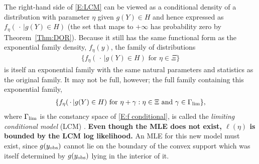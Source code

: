 The right-hand side of \eqref{E:LCM} can be viewed as a conditional density of a 
distribution with parameter $\eta$ given $g(Y) \in H$ and hence expressed as $f_{\eta}
(\, \cdot\,  | g(Y) \in H)$ (the set that maps to $+\infty$ has probability zero by 
Theorem~\ref{Thm:DOR}).  Because it still has the same functional form as the 
exponential family density, $f_\eta(y)$, the family of distributions
\begin{align} \label{E:f conditional}
\{ f_{\eta}(\, \cdot\,  | g(Y) \in H) \text{ for } \eta \in \Xi \}
\end{align}
is itself an exponential family with the same natural parameters and statistics as the 
original family.  
It may not be full, however; the full family containing this exponential family,
\begin{align*}
\{ f_{\eta}(\, \cdot\,  | g(Y) \in H) \text{ for }  \eta + \gamma: \eta \in \Xi \text
{ and } \gamma \in \Gamma_{\textrm{lim}} \},
\end{align*}
where $\Gamma_{\textrm{lim}}$ is the constancy space of \eqref{E:f conditional},
is called the \emph{limiting conditional model} (LCM) \citep{Geyer:gdor}.  
\textbf{Even though the MLE does not exist, $\ell(\eta)$ is bounded by the LCM log 
likelihood.}
An MLE for this new model must exist, since $g(y_{\textrm{obs}})$ cannot lie on the boundary of 
the convex support which was itself determined by $g(y_{\textrm{obs}})$ lying in the interior of 
it.  


